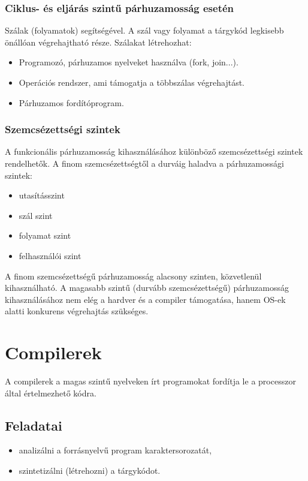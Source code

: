 \subsubsection{Ciklus- és eljárás szintű párhuzamosság esetén}
Szálak (folyamatok) segítségével.
A szál vagy folyamat a tárgykód legkisebb önállóan végrehajtható része.
Szálakat létrehozhat:
\begin{itemize}
    \item Programozó, párhuzamos nyelveket használva (fork, join...).
    \item Operációs rendszer, ami támogatja a többszálas végrehajtást.
    \item Párhuzamos fordítóprogram.
\end{itemize}
\subsubsection{Szemcsézettségi szintek}
A funkcionális párhuzamosság kihasználásához különböző szemcsézettségi szintek rendelhetők.
A finom szemcsézettségtől a durváig haladva a párhuzamossági szintek:
\begin{itemize}
    \item utasításszint
    \item szál szint
    \item folyamat szint
    \item felhasználói szint
\end{itemize}
A finom szemcsézettségű párhuzamosság alacsony szinten, közvetlenül kihasználható.
A magasabb szintű (durvább szemcsézettségű) párhuzamosság kihasználásához nem elég a hardver és a compiler támogatása, hanem OS-ek alatti konkurens végrehajtás szükséges.

\section{Compilerek}
A compilerek a magas szintű nyelveken írt programokat fordítja le a processzor által értelmezhető kódra.

\subsection{Feladatai}
\begin{itemize}
    \item analizálni a forrásnyelvű program karaktersorozatát,
    \item szintetizálni (létrehozni) a tárgykódot.
\end{itemize}


